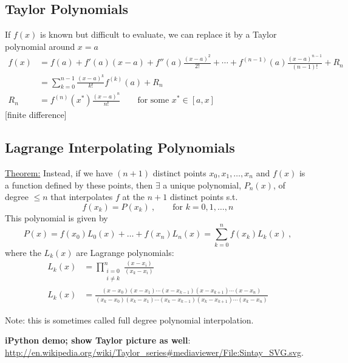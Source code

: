 \documentclass[12pt]{article}
\begin{document}
\subsection*{Taylor Polynomials}
If $f(x)$ is known but difficult to evaluate, we can replace it by a Taylor polynomial around $x = a$
\begin{align}
f(x) &= f(a) + f'(a)(x-a) + f''(a)\frac{(x-a)^2}{2!} + \cdots + f^{(n-1)}(a)\frac{(x-a)^{n-1}}{(n-1)!} + R_n \nonumber \\
%
  &= \sum_{k=0}^{n-1}\frac{(x-a)^k}{k!}f^{(k)}(a) + R_n \nonumber\\
%
R_n &= f^{(n)}(x^*)\frac{(x-a)^{n}}{n!} \qquad \text{for some } x^* \in [a, x]\nonumber
\end{align}
[finite difference]


\subsection*{Lagrange Interpolating Polynomials}
%
\underline{Theorem:} 
Instead, if we have $(n+1)$ distinct points $x_0, x_1,\dots, x_n$ and $f(x)$ is a function defined by these points, then $\exists$ a unique polynomial, $P_n(x)$, of degree $\leq n$ that interpolates $f$ at the $n + 1$ distinct points s.t.\
\[f(x_k) = P(x_k)\:, \qquad \text{for }k= 0, 1, \dots, n\]
%
This polynomial is given by
%
\[P(x) = f(x_0)L_0(x) + \dots + f(x_n)L_n(x) = \sum_{k=0}^{n}f(x_k)L_k(x)\:,\]
%
where the $L_k(x)$ are Lagrange polynomials:
%
\begin{align}
L_k(x) &= \prod_{\substack{i=0\\ i \neq k}}^n \frac{(x-x_i)}{(x_k-x_i)}\nonumber\\
%
L_k(x) &= \frac{(x-x_0)(x-x_1)\cdots(x-x_{k-1})(x-x_{k+1})\cdots(x-x_n)}{(x_k-x_0)(x_k-x_1)\cdots(x_k-x_{k-1})(x_k-x_{k+1})\cdots(x_k-x_n)}\nonumber
\end{align}

Note: this is sometimes called full degree polynomial interpolation.

\textbf{iPython demo; show Taylor picture as well}:\\ \href{http://en.wikipedia.org/wiki/Taylor_series#mediaviewer/File:Sintay_SVG.svg}{http://en.wikipedia.org/wiki/Taylor\_series\#mediaviewer/File:Sintay\_SVG.svg}.

\clearpage
\end{document}
